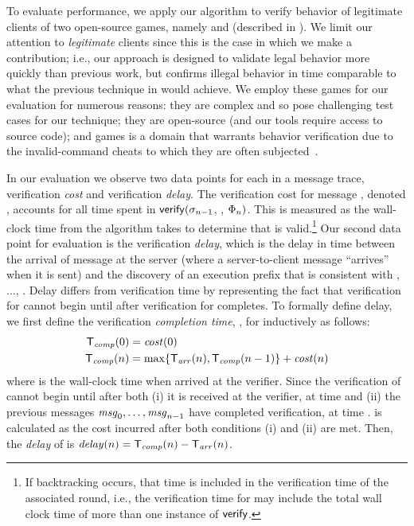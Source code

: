 To evaluate performance, we apply our algorithm to verify behavior of
legitimate clients of two open-source games, namely \xpilot and
\tetrinet (described in ).  We limit our
attention to \textit{legitimate} clients since this is the case in
which we make a contribution; i.e., our approach is designed to
validate legal behavior more quickly than previous work, but confirms
illegal behavior in time comparable to what the previous
technique in  would achieve.  We employ these games for
our evaluation for numerous reasons: they are complex and so pose
challenging test cases for our technique; they are open-source (and
our tools require access to source code); and games is a domain that
warrants behavior verification due to the invalid-command cheats to
which they are often subjected~\cite{webb08:survey}.

In our evaluation we observe two data points for each \msg{\msgNmbr} in
a message trace, verification \textit{cost} and verification
\textit{delay}. The verification cost for message \msg{\msgNmbr},
denoted \cost{\msgNmbr}, accounts for all time spent in
$\mathsf{verify}(\sigma_{n-1}$, \msg{\msgNmbr},
$\Phi_{n})$. This is measured as the wall-clock time from
the algorithm takes to determine that \msg{\msgNmbr} is
valid.\footnote{If backtracking occurs, that time is included in the
verification time of the associated round, i.e., the verification time
for \msg{\msgNmbr} may include the total wall clock time of more than
one instance of $\mathsf{verify}$.}  Our second data point
for evaluation is the verification \textit{delay}, which is the delay
in time between the arrival of message \msg{\msgNmbr} at the server
(where a server-to-client message ``arrives'' when it is sent) and the
discovery of an execution prefix \execPrefix{\msgNmbr} that is
consistent with , $\ldots$, \msg{\msgNmbr}.  Delay differs from
verification time by representing the fact that verification for
\msg{\msgNmbr} cannot begin until after verification for 
completes.  To formally define delay, we first define the verification
\textit{completion time}, \completion{}, for \msg{\msgNmbr}
inductively as follows:
\begin{align*}
\mathsf{T}_\mathit{comp}({0}) & = \mathit{cost}({0}) \\
\mathsf{T}_\mathit{comp}({n}) & = \max\{\mathsf{T}_\mathit{arr}({n}),\mathsf{T}_\mathit{comp}({n-1})\} + \mathit{cost}({n})
\end{align*}
where \arrival{\msgNmbr} is the wall-clock time when \msg{\msgNmbr}
arrived at the verifier.  Since the verification of \msg{\msgNmbr}
cannot begin until after both (i) it is received at the verifier, at
time \arrival{\msgNmbr} and (ii) the previous messages
$\mathit{msg}_{0},\ldots,\mathit{msg}_{n-1}$ have completed verification, at time
. \completion{\msgNmbr} is calculated as the
cost \cost{\msgNmbr} incurred after both conditions (i) and (ii) are
met.  Then, the \textit{delay} of \msg{\msgNmbr} is $\mathit{delay}({n}) =
\mathsf{T}_\mathit{comp}({n}) - \mathsf{T}_\mathit{arr}({n})$.

